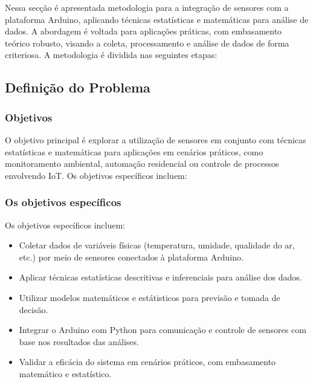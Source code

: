 \documentclass[12pt, a4paper]{article}
\begin{document}
Nessa secção é apresentada metodologia para a integração de sensores com a plataforma Arduino, aplicando
técnicas estatísticas e matemáticas para análise de dados. A abordagem é voltada para aplicações práticas, com
embasamento teórico robusto, visando a coleta, processamento e análise de dados de forma criteriosa. A metodologia é
dividida nas seguintes etapas:

\subsection{Definição do Problema}
\subsubsection{Objetivos}
O objetivo principal é explorar a utilização de sensores em conjunto com técnicas estatísticas e matemáticas
para aplicações em cenários práticos, como monitoramento ambiental, automação residencial ou controle de processos
envolvendo IoT. Os objetivos específicos incluem:
\subsubsection{Os objetivos específicos}
Os objetivos específicos incluem:

\begin{itemize}
    \item Coletar dados de variáveis físicas (temperatura, umidade, qualidade do ar, etc.) por meio de sensores conectados à plataforma Arduino.
    \item Aplicar técnicas estatísticas descritivas e inferenciais para análise dos dados.
    \item Utilizar modelos matemáticos e estátisticos para previsão e tomada de decisão.
    \item Integrar o Arduino com Python para comunicação e controle de sensores com base nos resultados das análises.
    \item Validar a eficácia do sistema em cenários práticos, com embasamento matemático e estatístico.
\end{itemize}
\end{document}

